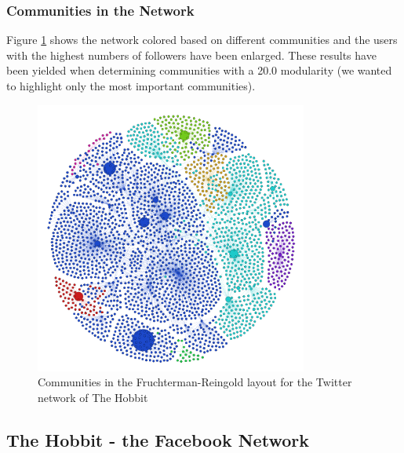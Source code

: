 \documentclass{llncs}
\begin{document}
\subsubsection{Communities in the Network}
Figure \ref{fig:hobbit-twitter-communities} shows the network colored based on
different communities and the users with the highest numbers of followers have
been enlarged. These results have been yielded when determining communities with
a 20.0 modularity (we wanted to highlight only the most important communities).
%
\begin{figure}
\centering
\includegraphics[width=0.8\textwidth]{hobbit-twitter-communities.png}
\caption{Communities in the Fruchterman-Reingold layout for the Twitter network
    of The Hobbit
\label{fig:hobbit-twitter-communities}}
\end{figure}
%
\pagebreak
\subsection{The Hobbit - the Facebook Network}
\end{document}
